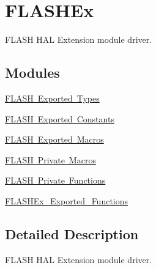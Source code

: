 \hypertarget{group___f_l_a_s_h_ex}{}\section{F\+L\+A\+S\+H\+Ex}
\label{group___f_l_a_s_h_ex}


F\+L\+A\+SH H\+AL Extension module driver.  


\subsection*{Modules}
\begin{DoxyCompactItemize}
\item 
\mbox{\hyperlink{group___f_l_a_s_h_ex___exported___types}{F\+L\+A\+S\+H Exported Types}}
\item 
\mbox{\hyperlink{group___f_l_a_s_h_ex___exported___constants}{F\+L\+A\+S\+H Exported Constants}}
\item 
\mbox{\hyperlink{group___f_l_a_s_h___exported___macros}{F\+L\+A\+S\+H Exported Macros}}
\item 
\mbox{\hyperlink{group___f_l_a_s_h_ex___private___macros}{F\+L\+A\+S\+H Private Macros}}
\item 
\mbox{\hyperlink{group___f_l_a_s_h_ex___private___functions}{F\+L\+A\+S\+H Private Functions}}
\item 
\mbox{\hyperlink{group___f_l_a_s_h_ex___exported___functions}{F\+L\+A\+S\+H\+Ex\+\_\+\+Exported\+\_\+\+Functions}}
\end{DoxyCompactItemize}


\subsection{Detailed Description}
F\+L\+A\+SH H\+AL Extension module driver. 

